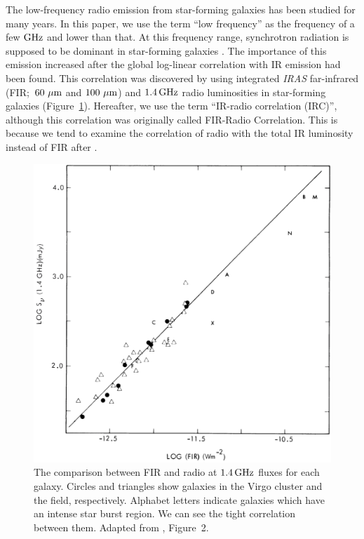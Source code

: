 The low-frequency radio emission from star-forming galaxies has been studied for many years.
In this paper, we use the term ``low frequency'' as the frequency of a few $\mathrm{GHz}$ and lower than that.
At this frequency range, synchrotron radiation is supposed to be dominant in star-forming galaxies \citep{Condon1992a}.
The importance of this emission increased after the global log-linear correlation with IR emission had been found.
This correlation was discovered by \citet{Helou1985} using integrated {\it IRAS\/} far-infrared (FIR;~$60\,\,\mathrm{\mu m}$ and $100\,\,\mathrm{\mu m}$) and $1.4\,\mathrm{GHz}$ radio luminosities in star-forming galaxies (Figure~\ref{fig:Helou1985_figure2}).
Hereafter, we use the term ``IR-radio correlation (IRC)'', although this correlation was originally called FIR-Radio Correlation.
This is because we tend to examine the correlation of radio with the total IR luminosity instead of FIR after \citet{Bell2003}.

\begin{figure}[htbp]
	\centering
	\includegraphics[width=.6\linewidth]{Chapter_1/Figures/Helou1985_Figure2.png}
    \caption[FIR and radio correlation]{\label{fig:Helou1985_figure2}
        The comparison between FIR and radio at $1.4\,\mathrm{GHz}$ fluxes for each galaxy.
        Circles and triangles show galaxies in the Virgo cluster and the field, respectively.
        Alphabet letters indicate galaxies which have an intense star burst region.
        We can see the tight correlation between them.
        Adapted from \citealt{Helou1985}, Figure~2.
    }
\end{figure}

